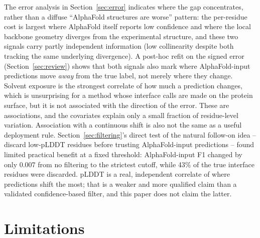 \documentclass[10pt]{article}
\begin{document}
The error analysis in Section~\ref{sec:error} indicates where the gap
concentrates, rather than a diffuse ``AlphaFold structures are worse''
pattern: the per-residue cost is largest where AlphaFold itself reports low
confidence and where the local backbone geometry diverges from the
experimental structure, and these two signals carry partly independent
information (low collinearity despite both tracking the same underlying
divergence). A post-hoc refit on the signed error (Section~\ref{sec:review}) shows that both signals
also mark where AlphaFold-input predictions move \emph{away} from the true
label, not merely where they change. Solvent exposure is the strongest
correlate of how much a prediction changes, which is unsurprising for a
method whose interface calls are made on the protein surface, but it is not
associated with the direction of the error. These are associations, and the
covariates explain only a small fraction of residue-level variation. Association with a continuous shift is also not the same as a useful
deployment rule. Section~\ref{sec:filtering}'s direct test of the natural
follow-on idea -- discard low-pLDDT residues before trusting AlphaFold-input
predictions -- found limited practical benefit at a fixed threshold:
AlphaFold-input F1 changed by only 0.007 from no filtering to
the strictest cutoff, while 43\% of the true
interface residues were discarded. pLDDT is a real, independent correlate of
where predictions shift the most; that is a weaker and more qualified claim
than a validated confidence-based filter, and this paper does not claim the
latter.

\section{Limitations}
\end{document}
